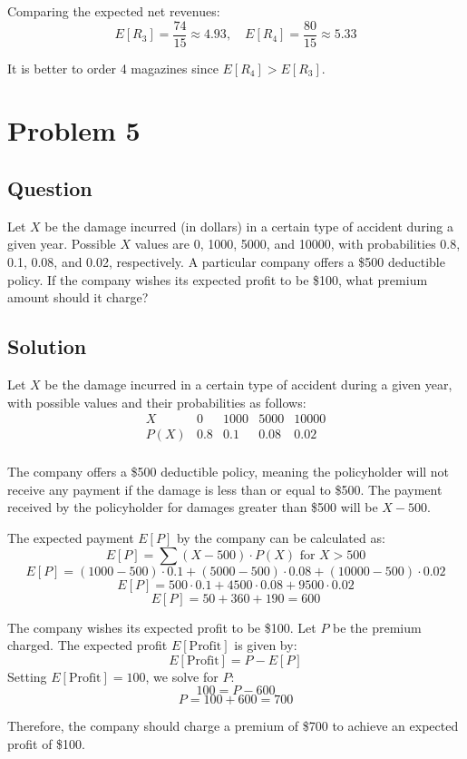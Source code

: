 \documentclass{article}
\begin{document}
Comparing the expected net revenues:
\[
E[R_3] = \frac{74}{15} \approx 4.93, \quad E[R_4] = \frac{80}{15} \approx 5.33
\]

It is better to order 4 magazines since \(E[R_4] > E[R_3]\).
\section*{Problem 5}
\subsection*{Question}
Let \(X\) be the damage incurred (in dollars) in a certain type of accident during a given year. Possible \(X\) values are 0, 1000, 5000, and 10000, with probabilities 0.8, 0.1, 0.08, and 0.02, respectively. A particular company offers a \$500 deductible policy. If the company wishes its expected profit to be \$100, what premium amount should it charge?

\subsection*{Solution}
Let \(X\) be the damage incurred in a certain type of accident during a given year, with possible values and their probabilities as follows:
\[
\begin{array}{c|cccc}
X & 0 & 1000 & 5000 & 10000 \\
\hline
P(X) & 0.8 & 0.1 & 0.08 & 0.02 \\
\end{array}
\]

The company offers a \$500 deductible policy, meaning the policyholder will not receive any payment if the damage is less than or equal to \$500. The payment received by the policyholder for damages greater than \$500 will be \(X - 500\).

The expected payment \(E[P]\) by the company can be calculated as:
\[
E[P] = \sum (X - 500) \cdot P(X) \text{ for } X > 500
\]
\[
E[P] = (1000 - 500) \cdot 0.1 + (5000 - 500) \cdot 0.08 + (10000 - 500) \cdot 0.02
\]
\[
E[P] = 500 \cdot 0.1 + 4500 \cdot 0.08 + 9500 \cdot 0.02
\]
\[
E[P] = 50 + 360 + 190 = 600
\]

The company wishes its expected profit to be \$100. Let \(P\) be the premium charged. The expected profit \(E[\text{Profit}]\) is given by:
\[
E[\text{Profit}] = P - E[P]
\]
Setting \(E[\text{Profit}] = 100\), we solve for \(P\):
\[
100 = P - 600
\]
\[
P = 100 + 600 = 700
\]

Therefore, the company should charge a premium of \$700 to achieve an expected profit of \$100.
\end{document}
